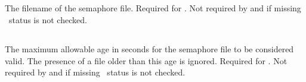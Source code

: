 \subsection{}
The filename of the semaphore file. Required for
. Not required by  and
if missing \ntp\ status is not checked.

\subsection{}
The maximum allowable age in seconds for the semaphore file to be
considered valid. The presence of a file older than this age is
ignored. Required for . Not required by
 and if missing \ntp\ status is not checked.


